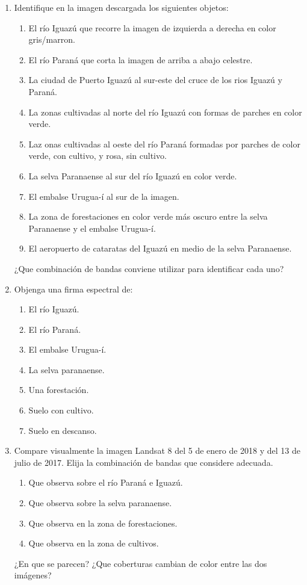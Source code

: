 \begin{enumerate}
  \item Identifique en la imagen descargada los siguientes objetos:
  \begin{enumerate}
    \item El río Iguazú que recorre la imagen de izquierda a derecha en color gris/marron.
    \item El río Paraná que corta la imagen de arriba a abajo celestre.
    \item La ciudad de Puerto Iguazú al sur-este del cruce de los rios Iguazú y Paraná.
    \item La zonas cultivadas al norte del río Iguazú con formas de parches en color verde.
    \item Laz onas cultivadas al oeste del río Paraná formadas por parches de color verde, con cultivo, y rosa, sin cultivo.
    \item La selva Paranaense al sur del río Iguazú en color verde.
    \item El embalse Urugua-í al sur de la imagen.
    \item La zona de forestaciones en color verde más oscuro entre la selva Paranaense y el embalse Urugua-í.
    \item El aeropuerto de cataratas del Iguazú en medio de la selva Paranaense.
  \end{enumerate}
  ¿Que combinación de bandas conviene utilizar para identificar cada uno?

  \item Objenga una firma espectral de:
  \begin{enumerate}
    \item El río Iguazú.
    \item El río Paraná.
    \item El embalse Urugua-í.
    \item La selva paranaense.
    \item Una forestación.
    \item Suelo con cultivo.
    \item Suelo en descanso.
  \end{enumerate}

  \item Compare visualmente la imagen Landsat 8 del 5 de enero de 2018 y del 13 de julio de 2017. Elija la combinación de bandas que considere adecuada.
  \begin{enumerate}
    \item Que observa sobre el río Paraná e Iguazú.
    \item Que observa sobre la selva paranaense.
    \item Que observa en la zona de forestaciones.
    \item Que observa en la zona de cultivos.
  \end{enumerate}
  ¿En que se parecen? ¿Que coberturas cambian de color entre las dos imágenes?


\end{enumerate}
